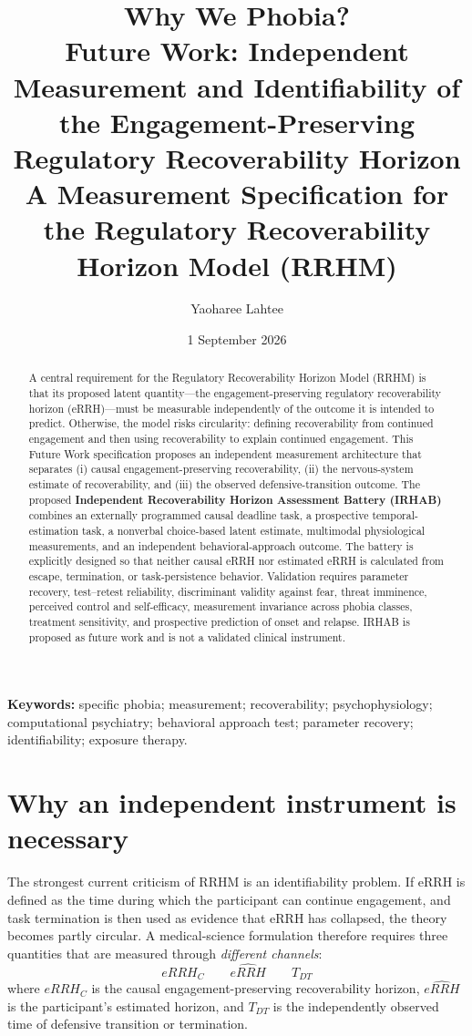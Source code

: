 \documentclass[11pt]{article}
\title{\textbf{Why We Phobia?}\\[0.35em]
\large Future Work: Independent Measurement and Identifiability of the Engagement-Preserving Regulatory Recoverability Horizon\\[0.2em]
\normalsize A Measurement Specification for the Regulatory Recoverability Horizon Model (RRHM)}
\author{Yaoharee Lahtee}
\date{1 September 2026}
\begin{document}
\maketitle

\begin{abstract}
A central requirement for the Regulatory Recoverability Horizon Model (RRHM) is that its proposed latent quantity---the engagement-preserving regulatory recoverability horizon (eRRH)---must be measurable independently of the outcome it is intended to predict. Otherwise, the model risks circularity: defining recoverability from continued engagement and then using recoverability to explain continued engagement. This Future Work specification proposes an independent measurement architecture that separates (i) causal engagement-preserving recoverability, (ii) the nervous-system estimate of recoverability, and (iii) the observed defensive-transition outcome. The proposed \textbf{Independent Recoverability Horizon Assessment Battery (IRHAB)} combines an externally programmed causal deadline task, a prospective temporal-estimation task, a nonverbal choice-based latent estimate, multimodal physiological measurements, and an independent behavioral-approach outcome. The battery is explicitly designed so that neither causal eRRH nor estimated eRRH is calculated from escape, termination, or task-persistence behavior. Validation requires parameter recovery, test--retest reliability, discriminant validity against fear, threat imminence, perceived control and self-efficacy, measurement invariance across phobia classes, treatment sensitivity, and prospective prediction of onset and relapse. IRHAB is proposed as future work and is not a validated clinical instrument.
\end{abstract}

\noindent\textbf{Keywords:} specific phobia; measurement; recoverability; psychophysiology; computational psychiatry; behavioral approach test; parameter recovery; identifiability; exposure therapy.

\section{Why an independent instrument is necessary}
The strongest current criticism of RRHM is an identifiability problem. If eRRH is defined as the time during which the participant can continue engagement, and task termination is then used as evidence that eRRH has collapsed, the theory becomes partly circular. A medical-science formulation therefore requires three quantities that are measured through \emph{different channels}:
\[
\boxed{eRRH_C}\qquad\boxed{\widehat{eRRH}}\qquad\boxed{T_{DT}}
\]
where $eRRH_C$ is the causal engagement-preserving recoverability horizon, $\widehat{eRRH}$ is the participant's estimated horizon, and $T_{DT}$ is the independently observed time of defensive transition or termination.
\end{document}
